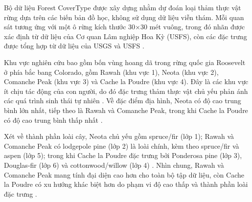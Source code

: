 Bộ dữ liệu Forest CoverType được xây dựng nhằm dự đoán loại thảm thực vật rừng
dựa trên các biến bản đồ học, không sử dụng dữ liệu viễn thám. Mỗi quan sát
tương ứng với một ô rừng kích thước 30×30 mét vuông, trong đó nhãn được xác
định từ dữ liệu của Cơ quan Lâm nghiệp Hoa Kỳ (USFS), còn các đặc trưng được
tổng hợp từ dữ liệu của USGS và USFS \cite{covertype_31}.

Khu vực nghiên cứu bao gồm bốn vùng hoang dã trong rừng quốc gia Roosevelt ở
phía bắc bang Colorado, gồm Rawah (khu vực 1), Neota (khu vực 2), Comanche Peak
(khu vực 3) và Cache la Poudre (khu vực 4). Đây là các khu vực ít chịu tác động
của con người, do đó đặc trưng thảm thực vật chủ yếu phản ánh các quá trình
sinh thái tự nhiên \cite{covertype_31}. Về đặc điểm địa hình, Neota có độ cao
trung bình lớn nhất, tiếp theo là Rawah và Comanche Peak, trong khi Cache la
Poudre có độ cao trung bình thấp nhất \cite{covertype_31}.

Xét về thành phần loài cây, Neota chủ yếu gồm spruce/fir (lớp 1); Rawah và
Comanche Peak có lodgepole pine (lớp 2) là loài chính, kèm theo spruce/fir và
aspen (lớp 5); trong khi Cache la Poudre đặc trưng bởi Ponderosa pine (lớp 3),
Douglas-fir (lớp 6) và cottonwood/willow (lớp 4) \cite{covertype_31}. Nhìn
chung, Rawah và Comanche Peak mang tính đại diện cao hơn cho toàn bộ tập dữ
liệu, còn Cache la Poudre có xu hướng khác biệt hơn do phạm vi độ cao thấp và
thành phần loài đặc trưng \cite{covertype_31}.
